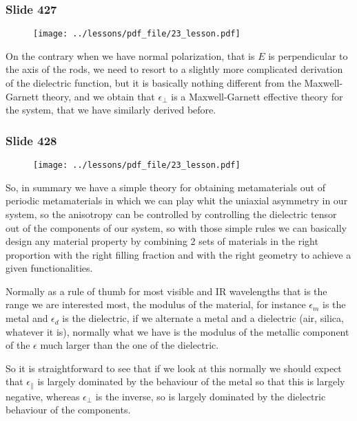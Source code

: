 \documentclass[../main/main.tex]{subfiles}
\begin{document}
\newpage

\subsubsection{Slide 427}

\begin{figure}[h!]
\centering
\texttt{[image: ../lessons/pdf\_file/23\_lesson.pdf]}
\end{figure}

On the contrary when we have normal polarization, that is $E$ is perpendicular to the axis of the rods, we need to resort to a slightly more complicated derivation of the dielectric function, but it is basically nothing different from the Maxwell-Garnett theory, and we obtain that $\epsilon_{\perp}$ is a Maxwell-Garnett effective theory for the system, that we have similarly derived before. 

\newpage

\subsubsection{Slide 428}

\begin{figure}[h!]
\centering
\texttt{[image: ../lessons/pdf\_file/23\_lesson.pdf]}
\end{figure}

So, in summary we have a simple theory for obtaining metamaterials out of periodic metamaterials in which we can play whit the uniaxial asymmetry in our system, so the anisotropy can be controlled by controlling the dielectric tensor out of the components of our system, so with those simple rules we can basically design any material property by combining 2 sets of materials in the right proportion with the right filling fraction and with the right geometry to achieve a given functionalities.

Normally as a rule of thumb for most visible and IR wavelengths that is the range we are interested most, the modulus of the material, for instance $\epsilon_m$ is the metal and $\epsilon_d$ is the dielectric, if we alternate a metal and a dielectric (air, silica, whatever it is), normally what we have is the modulus of the metallic component of the $\epsilon$ much larger than the one of the dielectric.

So it is straightforward to see that if we look at this normally we should expect that $\epsilon_{\parallel}$ is largely dominated by the behaviour of the metal so that this is largely negative, whereas $\epsilon_{\perp}$ is the inverse, so is largely dominated by the dielectric behaviour of the components.
\end{document}
